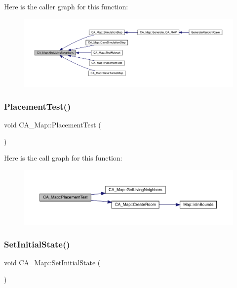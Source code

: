 Here is the caller graph for this function\+:
\nopagebreak
\begin{figure}[H]
\begin{center}
\leavevmode
\includegraphics[width=350pt]{df/dfe/class_c_a___map_ad57529f17a77b590fe93839c4b8bd5f9_icgraph}
\end{center}
\end{figure}
\mbox{\label{class_c_a___map_a142fc34721fe8d06cc93b61a27af9bda}} 
\subsubsection{\texorpdfstring{Placement\+Test()}{PlacementTest()}}
{\footnotesize\ttfamily void C\+A\+\_\+\+Map\+::\+Placement\+Test (\begin{DoxyParamCaption}{ }\end{DoxyParamCaption})}

Here is the call graph for this function\+:
\nopagebreak
\begin{figure}[H]
\begin{center}
\leavevmode
\includegraphics[width=350pt]{df/dfe/class_c_a___map_a142fc34721fe8d06cc93b61a27af9bda_cgraph}
\end{center}
\end{figure}
\mbox{\label{class_c_a___map_ad4c6a5b3ca7121d6c4593061d4bf3056}} 
\subsubsection{\texorpdfstring{Set\+Initial\+State()}{SetInitialState()}}
{\footnotesize\ttfamily void C\+A\+\_\+\+Map\+::\+Set\+Initial\+State (\begin{DoxyParamCaption}{ }\end{DoxyParamCaption})}

